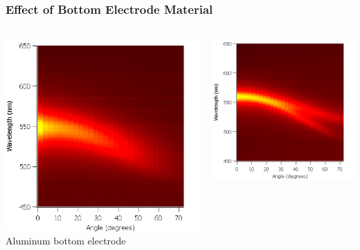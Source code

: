 \documentclass{beamer}
\begin{document}
\begin{frame}
\begin{columns}
\begin{column}{0.6\textwidth}
                \end{column}
            \end{columns}
        \end{frame}
        
        \begin{frame}
            \frametitle{Effect of Bottom Electrode Material}
            \begin{columns}
				\begin{column}{0.5\textwidth}
					\centering
					\includegraphics[width=\textwidth]{images/n1_ag_top_heatmap.png}
					Aluminum bottom electrode
				\end{column}
				\begin{column}{0.5\textwidth}
					\centering
					\includegraphics[width=\textwidth]{images/n1_al_top_heatmap.png}

\end{column}
\end{columns}
\end{frame}
\end{document}
